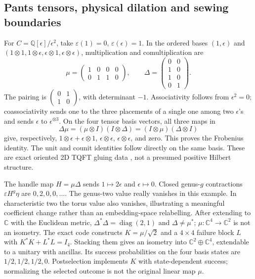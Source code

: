 \documentclass[11pt]{article}
\theoremstyle{definition}\newtheorem{definition}[theorem]{Definition}
\theoremstyle{remark}\newtheorem{remark}[theorem]{Remark}
\begin{document}
\subsection{Pants tensors, physical dilation and sewing boundaries}
For $C=\mathbb Q[\epsilon]/\epsilon^2$, take
$\varepsilon(1)=0$, $\varepsilon(\epsilon)=1$. In the ordered bases
$(1,\epsilon)$ and $(1\otimes1,1\otimes\epsilon,
\epsilon\otimes1,\epsilon\otimes\epsilon)$, multiplication and
comultiplication are
\[
 \mu=\begin{pmatrix}1&0&0&0\\0&1&1&0\end{pmatrix},\qquad
 \Delta=\begin{pmatrix}0&0\\1&0\\1&0\\0&1\end{pmatrix}.
\]
The pairing is
$\left(\begin{smallmatrix}0&1\\1&0\end{smallmatrix}\right)$,
with determinant $-1$. Associativity follows from $\epsilon^2=0$;
coassociativity sends one to the three placements of a single one among
two $\epsilon$'s and sends $\epsilon$ to $\epsilon^{\otimes3}$.
On the four tensor basis vectors, all three maps in
\[
 \Delta\mu=(\mu\otimes I)(I\otimes\Delta)
          =(I\otimes\mu)(\Delta\otimes I)
\]
give, respectively, $1\otimes\epsilon+\epsilon\otimes1$,
$\epsilon\otimes\epsilon$, $\epsilon\otimes\epsilon$, and zero.
This proves the Frobenius identity. The unit and counit identities follow
directly on the same basis. These are exact oriented 2D TQFT gluing data
\cite{LFAbrams}, not a presumed positive Hilbert structure.

The handle map $H=\mu\Delta$ sends $1\mapsto2\epsilon$ and
$\epsilon\mapsto0$. Closed genus-$g$ contractions
$\varepsilon H^g\eta$ are $0,2,0,0,\ldots$.
The genus-two value really vanishes in this example. In characteristic
two the torus value also vanishes, illustrating a meaningful coefficient
change rather than an embedding-space relabelling.
After extending to $\mathbb C$ with the Euclidean metric,
$\Delta^*\Delta=\operatorname{diag}(2,1)$ and $\Delta\ne\mu^*$;
$\mu:\mathbb C^4\to\mathbb C^2$ is not an isometry.
The exact code constructs $K=\mu/\sqrt2$ and a $4\times4$ failure block
$L$ with $K^*K+L^*L=I_4$. Stacking them gives an isometry into
$\mathbb C^2\oplus\mathbb C^4$, extendable to a unitary with ancillas.
Its success probabilities on the four basis states are
$1/2,1/2,1/2,0$. Postselection implements $K$ with state-dependent success;
normalizing the selected outcome is not the original linear map $\mu$.
\end{document}
